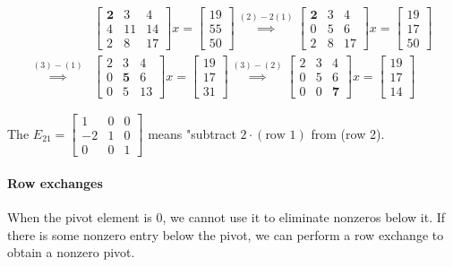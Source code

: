 \begin{align*}
    &\begin{bmatrix} \mathbf{2} & 3 & 4 \\ 4 & 11 & 14 \\ 2 & 8 & 17 \end{bmatrix}
    x
    =
    \begin{bmatrix} 19 \\ 55 \\ 50 \end{bmatrix}
    \stackrel{(2)-2(1)}{\implies}
    \begin{bmatrix} \mathbf{2} & 3 & 4 \\ 0 & 5 & 6 \\ 2 & 8 & 17 \end{bmatrix}
    x
    =
    \begin{bmatrix} 19 \\ 17 \\ 50 \end{bmatrix}
    \\
    \stackrel{(3)-(1)}{\implies}
    &\begin{bmatrix} 2 & 3 & 4 \\ 0 & \mathbf{5} & 6 \\ 0 & 5 & 13 \end{bmatrix}
    x
    =
    \begin{bmatrix} 19 \\ 17 \\ 31 \end{bmatrix}
    \stackrel{(3)-(2)}{\implies}
    \begin{bmatrix} 2 & 3 & 4 \\ 0 & 5 & 6 \\ 0 & 0 & \mathbf{7} \end{bmatrix}
    x
    =
    \begin{bmatrix} 19 \\ 17 \\ 14 \end{bmatrix}
\end{align*}

The  $E_{21} = \begin{bmatrix}
    1 & 0 & 0 \\ -2 & 1 & 0 \\ 0 & 0 & 1
\end{bmatrix}$ means "subtract $2\cdot(\text{row 1})$ from (row 2).

\paragraph{Row exchanges} When the pivot element is $0$, we
cannot use it to eliminate nonzeros below it. If there is some
nonzero entry below the pivot, we can perform a row exchange to
obtain a nonzero pivot.

